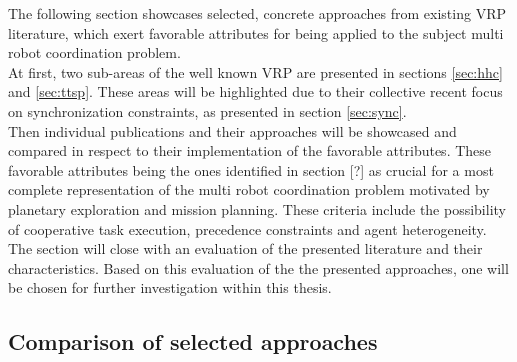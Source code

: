The following section showcases selected, concrete approaches from existing VRP literature, which exert favorable attributes for being applied to the subject multi robot coordination problem.\\
At first, two sub-areas of the well known VRP are presented in sections \ref{sec:hhc} and \ref{sec:ttsp}. These areas will be highlighted due to their collective recent focus on synchronization constraints, as presented in section \ref{sec:sync}.\\
Then individual publications and their approaches will be showcased and compared in respect to their implementation of the favorable attributes. These favorable attributes being the ones identified in section [?] as crucial for a most complete representation of the multi robot coordination problem motivated by planetary exploration and mission planning. These criteria include the possibility of cooperative task execution, precedence constraints and agent heterogeneity.\\
The section will close with an evaluation of the presented literature and their characteristics. Based on this evaluation of the the presented approaches, one will be chosen for further investigation within this thesis.



\subsection{Comparison of selected approaches}

%

